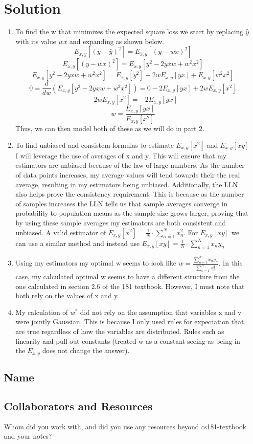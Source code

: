 \documentclass[submit]{harvardml}
\newenvironment{solution}
  {\color{blue}\section*{Solution}}
{}
\begin{document}
\begin{solution}
	\begin{enumerate}
	    \item To find the w that minimizes the expected square loss we start by replacing $\hat{y}$ with its value $wx$ and expanding as shown below.
        $$ E_{x, y}\left[(y-\hat{y})^2\right] = E_{x, y}\left[(y-wx)^2\right]$$
        $$ E_{x, y}\left[(y-wx)^2\right] = E_{x, y}[y^2 - 2yxw + w^2x^2]$$
        $$ E_{x, y}[y^2 - 2yxw + w^2x^2] = E_{x, y}[y^2] -2wE_{x, y}[yx] + E_{x,y}[w^2x^2]$$
        $$ 0 = \frac{d}{dw}\left(E_{x, y}[y^2 - 2yxw + w^2x^2]\right) = 0 - 2E_{x, y}\left[yx\right] + 2wE_{x, y}\left[x^2\right]$$
        $$ -2wE_{x,y}\left[x^2\right] = -2E_{x,y}\left[yx\right] $$
        $$ w = \frac{E_{x,y}\left[yx\right]}{E_{x,y}\left[x^2\right]}$$
        Thus, we can then model both of these as we will do in part 2.
        \item To find unbiased and consistem formulas to estimate $E_{x,y}[x^2]$ and $E_{x,y}[xy]$ I will leverage the use of averages of x and y. This will ensure that my estimators are unbiased because of the law of large numbers. As the number of data points increases, my average values will tend towards their the real average, resulting in my estimators being unbiased. Additionally, the LLN also helps prove the consistency requirement. This is because as the number of samples increases the LLN tells us that sample averages converge in probability to population means as the sample size grows larger, proving that by using these sample averages my estimators are both consistent and unbiased. A valid estimator of $E_{x,y}[x^2] = \frac{1}{N} \cdot \sum_{n=1}^Nx_n^2$. For $E_{x,y}[xy]$ we can use a similar method and instead use $E_{x,y}[xy] = \frac{1}{N} \cdot \sum_{n = 1}^N x_ny_n$
        \item Using my estimators my optimal w seems to look like $w = \frac{\sum_{n=1}^N x_ny_n}{\sum_{n=1}^N x^2_n}$. In this case, my calculated optimal w seems to have a different structure from the one calculated in section 2.6 of the 181 textbook. However, I must note that both rely on the values of x and y. 
        \item My calculation of $w^*$ did not rely on the assumption that variables x and y were jointly Gaussian. This is because I only used rules for expectation that are true regardless of how the variables are distributed. Rules such as linearity and pull out constants (treated w as a constant seeing as being in the $E_{x,y}$ does not change the answer). 
	\end{enumerate}
\end{solution}

\newpage
\subsection*{Name}

\subsection*{Collaborators and Resources}
Whom did you work with, and did you use any resources beyond cs181-textbook and your notes?
\end{document}
